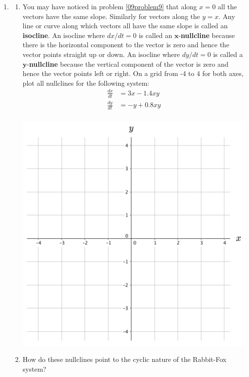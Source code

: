\begin{enumerate}[resume]
\item	
\label{09problem10}
\begin{enumerate}
\item You may have noticed in problem \ref{09problem9} that along $x = 0$ all the vectors have the same slope. Similarly for vectors along the $y = x$. Any line or curve along which vectors all have the same slope is called an \textbf{isocline}. An isocline where $dx/dt = 0$ is called an $\mathbf{x}$-\textbf{nullcline} because there is the horizontal component to the vector is zero and hence the vector points straight up or down. An isocline where $dy/dt = 0$ is called a $\mathbf{y}$-\textbf{nullcline} because the vertical component of the vector is zero and hence the vector points left or right. On a grid from -4 to 4 for both axes, plot all nullclines for the following system: \label{09problem10parta}
\begin{align*}
\frac{dx}{dt} &= 3x-1.4xy\\
\frac{dy}{dt} &= -y+0.8xy\\ 
\end{align*}
\begin{center}
\includegraphics[width=5in]{09/09VectorField2.png}
\end{center}
\item How do these nullclines point to the cyclic nature of the Rabbit-Fox system? \label{09problem10partb}
\end{enumerate}


\end{enumerate}
